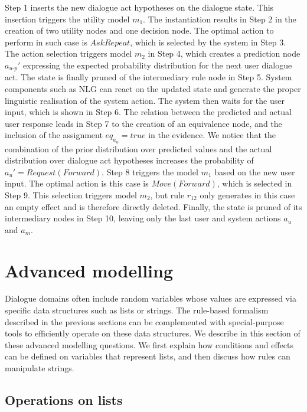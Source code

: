  
Step 1 inserts the new dialogue act hypotheses on the dialogue state.  This insertion triggers 
the utility model $m_1$. The instantiation results in Step 2 in the creation of two utility nodes and one decision node.  The optimal action to perform in such case is $\mathit{AskRepeat}$, which is selected by the system in Step 3. The action selection triggers model $m_2$ in Step 4, which creates a prediction node $a_{u\mbox{-}p}'$ expressing the expected probability distribution for the next user dialogue act. The state is finally pruned of the intermediary rule node in Step 5.  System components such as NLG can react on the updated state and generate the proper linguistic realisation of the system action. The system then waits for the user input, which is shown in Step 6.  The relation between the predicted and actual user response leads in Step 7 to the creation of an equivalence node, and the inclusion of the assignment $eq_{a_u} = true$ in the evidence. We notice that the combination of the prior distribution over predicted values and the actual distribution over dialogue act hypotheses increases the probability of $a_u' = \mathit{Request(Forward)}$. Step 8 triggers the model $m_1$ based on the new user input.  The optimal action is this case is $\mathit{Move(Forward)}$, which is selected in Step 9.  This selection triggers model $m_2$, but rule $r_{12}$ only generates in this case an empty effect and is therefore directly deleted. Finally, the state is pruned of its intermediary nodes in Step 10, leaving only the last user and system actions $a_u$ and $a_m$. 


\section{Advanced modelling}
\label{sec:amodelling}

Dialogue domains often include random variables whose values are expressed via specific data structures such as lists or strings. The rule-based formalism described in the previous sections can be complemented with special-purpose tools to efficiently operate on these data structures.  We describe in this section of these advanced modelling questions.  We first explain how conditions and effects can be defined on variables that represent lists, and then discuss how rules can manipulate strings. 

\subsection{Operations on lists}

